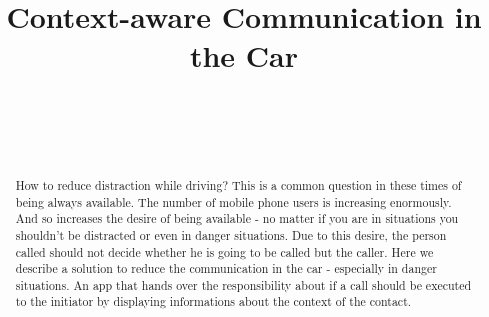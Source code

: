 \documentclass{sigchi}
\def\plaintitle{Context-aware Communication in the Car}
\begin{document}
\title{\plaintitle}

\author{%
  \\
  \\
  \\
}

\maketitle

\begin{abstract}
How to reduce distraction while driving? This is a common question in these times of being always available. The number of mobile phone users is increasing enormously. And so increases the desire of being available - no matter if you are in situations you shouldn't be distracted or even in danger situations. Due to this desire, the person called should not decide whether he is going to be called but the caller. Here we describe a solution to reduce the communication in the car - especially in danger situations. An app that hands over the responsibility about if a call should be executed to the initiator by displaying informations about the context of the contact.

\end{abstract}
\end{document}
